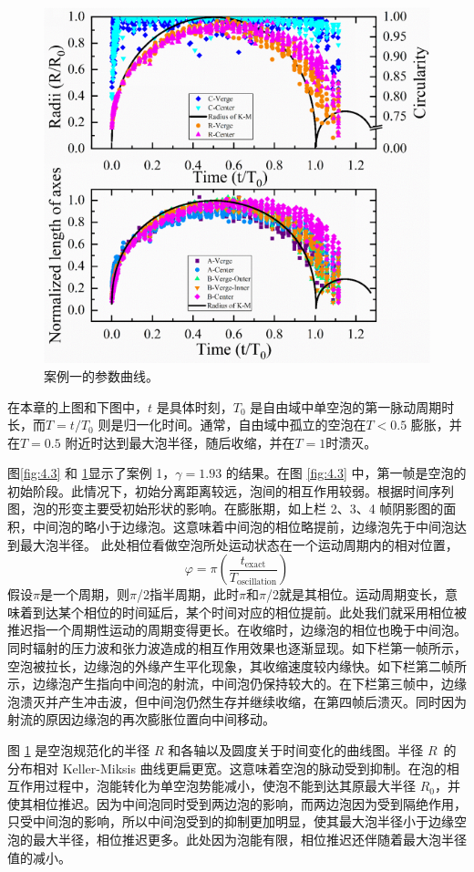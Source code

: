 \begin{figure}[H]
    \centering
    \includegraphics[width=0.7\linewidth]{img/fig4.4.png}
    \caption{案例一的参数曲线。}
    \label{fig:4.4}
\end{figure}


在本章的上图和下图中，$t$ 是具体时刻，$T_0$
是自由域中单空泡的第一脉动周期时长，而$T=t/T_0$
则是归一化时间。通常，自由域中孤立的空泡在$T<0.5$ 膨胀，并在$T=0.5$
附近时达到最大泡半径，随后收缩，并在$T=1$时溃灭。

图\ref{fig:4.3}  和 \ref{fig:4.4}显示了案例 1，$\gamma=1.93$ 的结果。在图 \ref{fig:4.3}
中，第一帧是空泡的初始阶段。此情况下，初始分离距离较远，泡间的相互作用较弱。根据时间序列图，泡的形变主要受初始形状的影响。在膨胀期，如上栏
2、3、4
帧阴影图的面积，中间泡的略小于边缘泡。这意味着中间泡的相位略提前，边缘泡先于中间泡达到最大泡半径。
此处相位看做空泡所处运动状态在一个运动周期内的相对位置，
\[\varphi=\pi(\frac{t_\mathrm{exact}}{T_\mathrm{oscillation}}) \]假设$\pi$是一个周期，则$\pi$/2指半周期，此时$\pi$和$\pi$/2就是其相位\cite{fong_interactions_2009}。运动周期变长，意味着到达某个相位的时间延后，某个时间对应的相位提前。此处我们就采用相位被推迟指一个周期性运动的周期变得更长。在收缩时，边缘泡的相位也晚于中间泡。同时辐射的压力波和张力波造成的相互作用效果也逐渐显现。如下栏第一帧所示，空泡被拉长，边缘泡的外缘产生平化现象，其收缩速度较内缘快。如下栏第二帧所示，边缘泡产生指向中间泡的射流，中间泡仍保持较大的。在下栏第三帧中，边缘泡溃灭并产生冲击波，但中间泡仍然生存并继续收缩，在第四帧后溃灭。同时因为射流的原因边缘泡的再次膨胀位置向中间移动。

图 \ref{fig:4.4} 是空泡规范化的半径 $R$ 和各轴以及圆度关于时间变化的曲线图。半径
$R\,$ 的分布相对 Keller-Miksis
曲线更扁更宽。这意味着空泡的脉动受到抑制。在泡的相互作用过程中，泡能转化为单空泡势能减小，使泡不能到达其原最大半径
$R_0$，并使其相位推迟。因为中间泡同时受到两边泡的影响，而两边泡因为受到隔绝作用\cite{bremond_interaction_2006,dear_study_1988,Dear1988a}，只受中间泡的影响，所以中间泡受到的抑制更加明显，使其最大泡半径小于边缘空泡的最大半径，相位推迟更多。此处因为泡能有限，相位推迟还伴随着最大泡半径值的减小。

